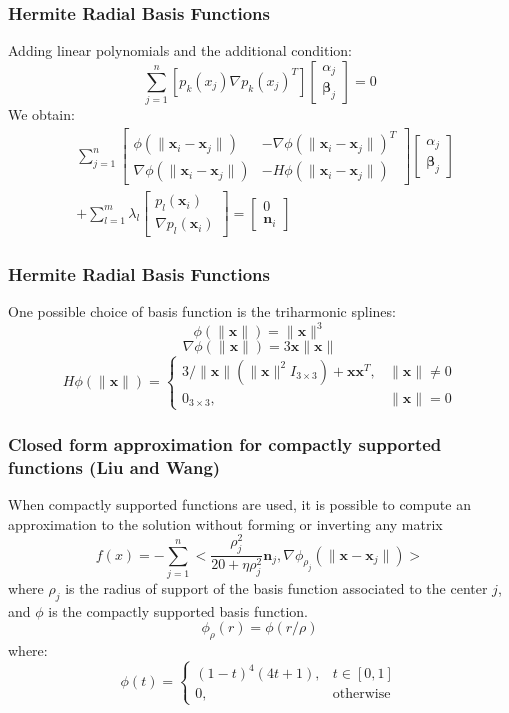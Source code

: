 \documentclass{beamer}
\def\x{\mathbf{x}}
\def\n{\mathbf{n}}
\def\bbeta{\boldsymbol\beta}
\begin{document}
\begin{frame}
	\frametitle{Hermite Radial Basis Functions}
	\Large
	Adding linear polynomials and the additional condition:
	\begin{equation} \label{hrbfcond}
	\sum_{j=1}^n[p_k(x_j)\nabla p_k(x_j)^T]\begin{bmatrix}\alpha_j\\\bbeta_j\end{bmatrix}=0
	\end{equation}
	We obtain:
	\begin{align} \label{hrbf1}
 & \sum_{j=1}^n
\begin{bmatrix}
\phi(\|\x_i-\x_j\|) & -\nabla\phi(\|\x_i-\x_j\|)^T\\ \nabla\phi(\|\x_i-\x_j\|) & -H\phi(\|\x_i-\x_j\|)
\end{bmatrix}
\begin{bmatrix}
\alpha_j\\\bbeta_j
\end{bmatrix} \nonumber
\\
 & + \sum_{l=1}^m\lambda_l
\begin{bmatrix}
p_l(\x_i)\\\nabla p_l(\x_i)
\end{bmatrix}
=
\begin{bmatrix}
0 \\ \n_i
\end{bmatrix}
\end{align}

\end{frame}


\begin{frame}
	\frametitle{Hermite Radial Basis Functions}
	\Large
	One possible choice of basis function is the triharmonic splines:
	\[ \phi(\|\x\|) = \|\x\|^3 \]
\[\nabla\phi(\|\x\|) = 3\x\|\x\|\]
\[ H \phi (\|\x\|)= \left\{ \begin{array}{ll} 3/\|\x\|(\|\x\|^2I_{3\times3}) + \x\x^T, & \|\x\| \neq 0\\ 
0_{3\times3}, &\|\x\| = 0 \end{array}\right.\]
\end{frame}


\begin{frame}
\frametitle{Closed form approximation for compactly supported functions (Liu and Wang)}

When compactly supported functions are used, 
it is possible to compute an approximation to the solution 
without forming or inverting any matrix
\begin{equation} \label{hrbfclosed}
f(x)=-\sum_{j=1}^n<\frac{\rho^2_j}{20+\eta\rho^2_j} \n_j, \nabla\phi_{\rho_j}(\|\x-\x_j\|)>
\end{equation}
where $\rho_j$ is the radius of support of the basis function associated to the center $j$, 
and $\phi$ is the compactly supported basis function. 
\[
\phi_{\rho}(r)=\phi(r/\rho)
\]
where:
\[
\phi (t)= \left\{ \begin{array}{ll} (1-t)^{4}(4t+1), & t \in [0,1]\\ 
0, & \text{otherwise} \end{array}\right.
\]

\end{frame}
\end{document}

